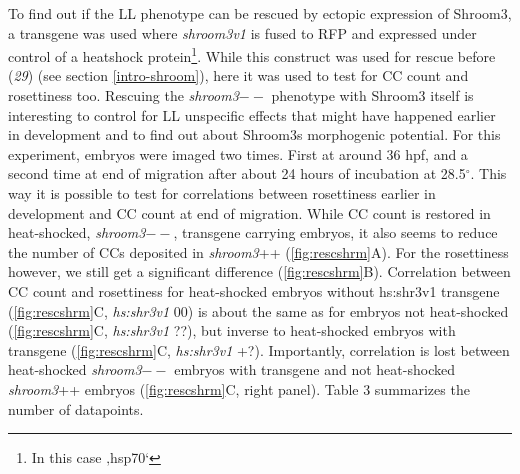 \documentclass[11pt,singlespacinge,twoside]{reedthesis} %
\begin{document}
To find out if the LL phenotype can be rescued by ectopic expression of Shroom3, a transgene was used where \emph{shroom3v1} is fused to RFP and expressed under control of a heatshock protein\footnote{In this case ‚hsp70`}. While this construct was used for rescue before (\emph{29}) (see section \ref{intro-shroom}), here it was used to test for CC count and rosettiness too. Rescuing the \emph{shroom3}\(--\) phenotype with Shroom3 itself is interesting to control for LL unspecific effects that might have happened earlier in development and to find out about Shroom3s morphogenic potential.
For this experiment, embryos were imaged two times. First at around 36 hpf, and a second time at end of migration after about 24 hours of incubation at 28.5\(^\circ\). This way it is possible to test for correlations between rosettiness earlier in development and CC count at end of migration.
While CC count is restored in heat-shocked, \emph{shroom3}\(--\), transgene carrying embryos, it also seems to reduce the number of CCs deposited in \emph{shroom3}++ (\ref{fig:rescshrm}A). For the rosettiness however, we still get a significant difference (\ref{fig:rescshrm}B). Correlation between CC count and rosettiness for heat-shocked embryos without hs:shr3v1 transgene (\ref{fig:rescshrm}C, \emph{hs:shr3v1} 00) is about the same as for embryos not heat-shocked (\ref{fig:rescshrm}C, \emph{hs:shr3v1} ??), but inverse to heat-shocked embryos with transgene (\ref{fig:rescshrm}C, \emph{hs:shr3v1} +?). Importantly, correlation is lost between heat-shocked \emph{shroom3}\(--\) embryos with transgene and not heat-shocked \emph{shroom3}++ embryos (\ref{fig:rescshrm}C, right panel). Table 3 summarizes the number of datapoints.
\end{document}
